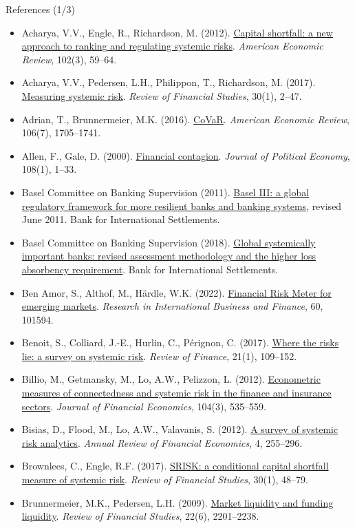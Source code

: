 \begin{frame}{References (1/3)}
\itemsize{\tiny}
\begin{itemize}
    \item Acharya, V.V., Engle, R., Richardson, M. (2012). \href{https://doi.org/10.1257/aer.102.3.59}{Capital shortfall: a new approach to ranking and regulating systemic risks}. \textit{American Economic Review}, 102(3), 59--64.
    \item Acharya, V.V., Pedersen, L.H., Philippon, T., Richardson, M. (2017). \href{https://doi.org/10.1093/rfs/hhw088}{Measuring systemic risk}. \textit{Review of Financial Studies}, 30(1), 2--47.
    \item Adrian, T., Brunnermeier, M.K. (2016). \href{https://doi.org/10.1257/aer.20120555}{CoVaR}. \textit{American Economic Review}, 106(7), 1705--1741.
    \item Allen, F., Gale, D. (2000). \href{https://doi.org/10.1086/262109}{Financial contagion}. \textit{Journal of Political Economy}, 108(1), 1--33.
    \item Basel Committee on Banking Supervision (2011). \href{https://www.bis.org/publ/bcbs189.htm}{Basel III: a global regulatory framework for more resilient banks and banking systems}, revised June 2011. Bank for International Settlements.
    \item Basel Committee on Banking Supervision (2018). \href{https://www.bis.org/bcbs/publ/d445.htm}{Global systemically important banks: revised assessment methodology and the higher loss absorbency requirement}. Bank for International Settlements.
    \item Ben Amor, S., Althof, M., Härdle, W.K. (2022). \href{https://doi.org/10.1016/j.ribaf.2021.101594}{Financial Risk Meter for emerging markets}. \textit{Research in International Business and Finance}, 60, 101594.
    \item Benoit, S., Colliard, J.-E., Hurlin, C., Pérignon, C. (2017). \href{https://doi.org/10.1093/rof/rfw026}{Where the risks lie: a survey on systemic risk}. \textit{Review of Finance}, 21(1), 109--152.
    \item Billio, M., Getmansky, M., Lo, A.W., Pelizzon, L. (2012). \href{https://doi.org/10.1016/j.jfineco.2011.12.010}{Econometric measures of connectedness and systemic risk in the finance and insurance sectors}. \textit{Journal of Financial Economics}, 104(3), 535--559.
    \item Bisias, D., Flood, M., Lo, A.W., Valavanis, S. (2012). \href{https://doi.org/10.1146/annurev-financial-110311-101754}{A survey of systemic risk analytics}. \textit{Annual Review of Financial Economics}, 4, 255--296.
    \item Brownlees, C., Engle, R.F. (2017). \href{https://doi.org/10.1093/rfs/hhw060}{SRISK: a conditional capital shortfall measure of systemic risk}. \textit{Review of Financial Studies}, 30(1), 48--79.
    \item Brunnermeier, M.K., Pedersen, L.H. (2009). \href{https://doi.org/10.1093/rfs/hhn098}{Market liquidity and funding liquidity}. \textit{Review of Financial Studies}, 22(6), 2201--2238.
\end{itemize}
\end{frame}

